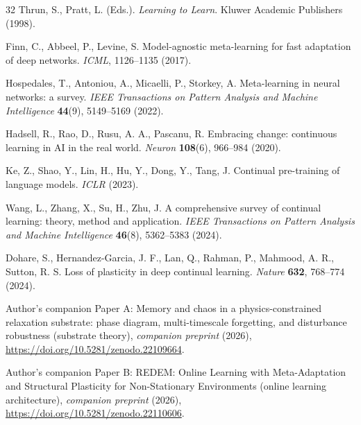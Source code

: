 \documentclass[preprint,12pt]{elsarticle}
\begin{document}
\begin{thebibliography}{32}
 Thrun, S., Pratt, L. (Eds.). \emph{Learning to
Learn}. Kluwer Academic Publishers (1998).

 Finn, C., Abbeel, P., Levine, S. Model-agnostic
meta-learning for fast adaptation of deep networks. \emph{ICML},
1126--1135 (2017).

 Hospedales, T., Antoniou, A., Micaelli, P.,
Storkey, A. Meta-learning in neural networks: a survey. \emph{IEEE
Transactions on Pattern Analysis and Machine Intelligence}
\textbf{44}(9), 5149--5169 (2022).

 Hadsell, R., Rao, D., Rusu, A. A., Pascanu, R.
Embracing change: continuous learning in AI in the real world.
\emph{Neuron} \textbf{108}(6), 966--984 (2020).

 Ke, Z., Shao, Y., Lin, H., Hu, Y., Dong, Y., Tang,
J. Continual pre-training of language models. \emph{ICLR} (2023).

 Wang, L., Zhang, X., Su, H., Zhu, J. A
comprehensive survey of continual learning: theory, method and
application. \emph{IEEE Transactions on Pattern Analysis and Machine
Intelligence} \textbf{46}(8), 5362--5383 (2024).

 Dohare, S., Hernandez-Garcia, J. F., Lan, Q.,
Rahman, P., Mahmood, A. R., Sutton, R. S. Loss of plasticity in deep
continual learning. \emph{Nature} \textbf{632}, 768--774 (2024).

 Author's companion Paper A: Memory and chaos in a
physics-constrained relaxation substrate: phase diagram, multi-timescale
forgetting, and disturbance robustness (substrate theory),
\emph{companion preprint} (2026),
\url{https://doi.org/10.5281/zenodo.22109664}.

 Author's companion Paper B: REDEM: Online Learning
with Meta-Adaptation and Structural Plasticity for Non-Stationary
Environments (online learning architecture),
\emph{companion preprint} (2026),
\url{https://doi.org/10.5281/zenodo.22110606}.

\end{thebibliography}
\endgroup
\end{document}
